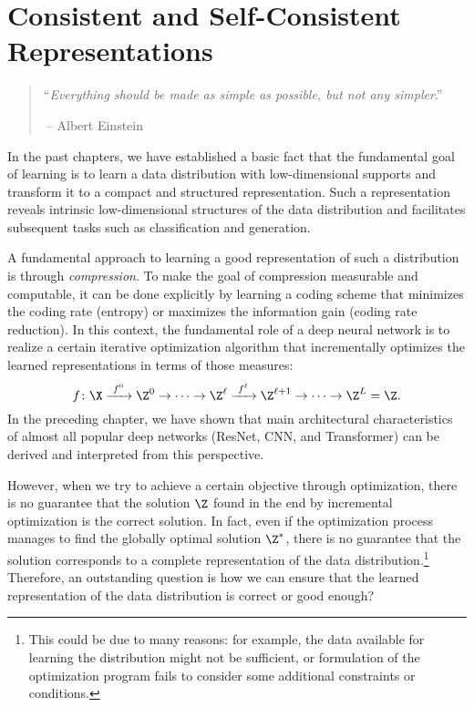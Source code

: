 \documentclass[../../book-main.tex]{subfiles}
\begin{document}
\chapter{Consistent and Self-Consistent Representations}
\label{ch:consistent}\label{ch:autoencoding}
\label{ch:self-consistent}\label{ch:closed-loop}

\begin{quote}
\hfill  ``{\em Everything should be made as simple as possible, but not any simpler}.''

$~$\hfill -- Albert Einstein
\end{quote}



\vspace{5mm}


In the past chapters, we have established a basic fact that the
fundamental goal of learning is to learn a data
distribution with low-dimensional supports and transform it to a compact and structured
representation. Such a representation reveals intrinsic
low-dimensional structures of the data distribution and facilitates
subsequent tasks such as classification and generation.

A fundamental approach to learning a good representation of such a
distribution is through {\em compression}. To make the
goal of compression measurable and computable, it can be done
explicitly by learning a coding scheme that minimizes the coding rate (entropy) or maximizes the information gain (coding rate
reduction). In this context, the fundamental role of a deep neural
network is to realize a certain iterative optimization algorithm that
incrementally optimizes the learned representations in terms of those measures:
\begin{equation}
  f\colon \X
  \xrightarrow{\hspace{1mm} f^0 \hspace{1mm}} \Z^0 \rightarrow \cdots
  \rightarrow \Z^\ell \xrightarrow{\hspace{1mm} f^\ell \hspace{1mm}}
  \Z^{\ell+1} \rightarrow  \cdots \to \Z^L = \Z.
\end{equation}
In the preceding chapter, we have shown that main architectural
characteristics of almost all popular deep networks (ResNet, CNN, and
Transformer) can be derived and interpreted from this perspective.

However, when we try to achieve a certain objective through
optimization, there is no guarantee that the solution $\Z$ found in
the end by incremental optimization is the correct solution. In fact, even if
the optimization process manages to find the globally optimal
solution $\Z^*$, there is no guarantee that the solution corresponds
to a complete representation of the data distribution.\footnote{This could be due to many reasons: for example, the data available for learning the distribution might not be sufficient, or formulation of the optimization program fails to consider some additional constraints or conditions.} Therefore, an outstanding question is how we can ensure that the learned representation of the data distribution is
correct or good enough? 
\end{document}
